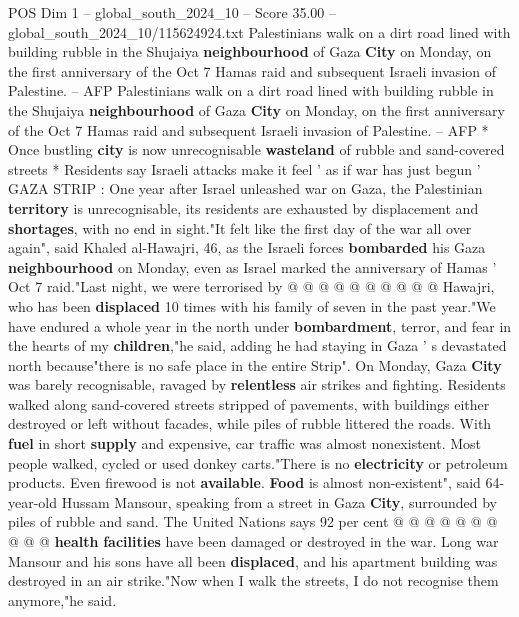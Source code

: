 \begin{textsample}{POS Dim 1 – global\_south\_2024\_10 – Score 35.00 – global\_south\_2024\_10/115624924.txt}  \label{ex:f1_pos_162}
Palestinians walk on a dirt road lined with building rubble in the Shujaiya \textbf{neighbourhood} of Gaza \textbf{City} on Monday, on the first anniversary of the Oct 7 Hamas raid and subsequent Israeli invasion of Palestine. -- AFP Palestinians walk on a dirt road lined with building rubble in the Shujaiya \textbf{neighbourhood} of Gaza \textbf{City} on Monday, on the first anniversary of the Oct 7 Hamas raid and subsequent Israeli invasion of Palestine. -- AFP * Once bustling \textbf{city} is now unrecognisable \textbf{wasteland} of rubble and sand-covered streets * Residents say Israeli attacks make it feel ' as if war has just begun ' GAZA STRIP : One year after Israel unleashed war on Gaza, the Palestinian \textbf{territory} is unrecognisable, its residents are exhausted by displacement and \textbf{shortages}, with no end in sight."It felt like the first day of the war all over again", said Khaled al-Hawajri, 46, as the Israeli forces \textbf{bombarded} his Gaza \textbf{neighbourhood} on Monday, even as Israel marked the anniversary of Hamas ' Oct 7 raid."Last night, we were terrorised by @ @ @ @ @ @ @ @ @ @ Hawajri, who has been \textbf{displaced} 10 times with his family of seven in the past year."We have endured a whole year in the north under \textbf{bombardment}, terror, and fear in the hearts of my \textbf{children},"he said, adding he had staying in Gaza ' s devastated north because"there is no safe place in the entire Strip".
On Monday, Gaza \textbf{City} was barely recognisable, ravaged by \textbf{relentless} air strikes and fighting.
Residents walked along sand-covered streets stripped of pavements, with buildings either destroyed or left without facades, while piles of rubble littered the roads.
With \textbf{fuel} in short \textbf{supply} and expensive, car traffic was almost nonexistent.
Most people walked, cycled or used donkey carts."There is no \textbf{electricity} or petroleum products.
Even firewood is not \textbf{available}. \textbf{Food} is almost non-existent", said 64-year-old Hussam Mansour, speaking from a street in Gaza \textbf{City}, surrounded by piles of rubble and sand.
The United Nations says 92 per cent @ @ @ @ @ @ @ @ @ @ \textbf{health} \textbf{facilities} have been damaged or destroyed in the war.
Long war Mansour and his sons have all been \textbf{displaced}, and his apartment building was destroyed in an air strike."Now when I walk the streets, I do not recognise them anymore,"he said.

\end{textsample}
